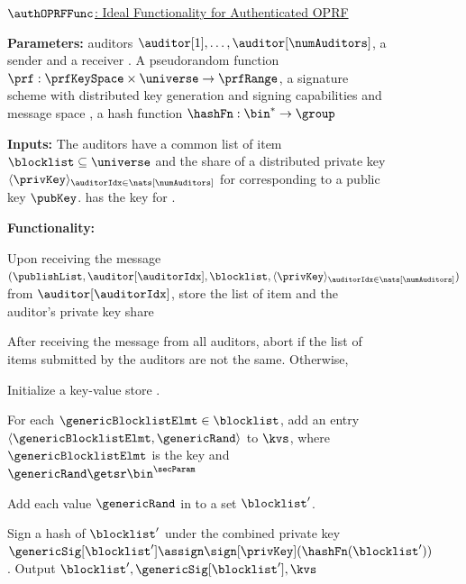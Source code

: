 \begin{figure}
\begin{mdframed}
\footnotesize 

\underline{$\authOPRFFunc$: Ideal Functionality for Authenticated OPRF}
		
		
		\smallskip\noindent\textbf{Parameters:} \numAuditors auditors $\auditor[1], \dots, \auditor[\numAuditors]$, a sender \client and a receiver \server. A pseudorandom function $\prf: \prfKeySpace \times \universe   \rightarrow \prfRange$, a signature scheme \ourSigSchemeDefn with distributed key generation and signing capabilities and message space \group, a hash function $\hashFn: \bin^{\ast} \rightarrow \group$   

		\smallskip\noindent\textbf{Inputs:} The auditors have a common list of item $\blocklist \subseteq \universe$ and the share of a distributed private key $\langle \privKey \rangle_{\auditorIdx \in \nats[\numAuditors]}$ for \ourSigScheme corresponding to a public key $\pubKey$. \client has the key \prfKey for \prf. 



		\smallskip\noindent\textbf{Functionality:} 
\itemListStart

\item	Upon receiving the message $(\publishList, \auditor[\auditorIdx], \blocklist, \langle \privKey \rangle_{\auditorIdx \in \nats[\numAuditors]})$ from $\auditor[\auditorIdx]$, store the list of item \blocklist and the auditor's private key share

\item After receiving the \publishList message from all auditors, abort if the list of items \blocklist submitted by the auditors are not the same. Otherwise, 

\enumListStart
\item Initialize a key-value store \kvs. 
\item For each $\genericBlocklistElmt \in \blocklist$, add an entry $\langle \genericBlocklistElmt, \genericRand \rangle$ to $\kvs$, where $\genericBlocklistElmt$ is the key and $\genericRand \getsr \bin^{\secParam}$
\item Add each value $\genericRand$ in \kvs to a set $\blocklist'$.   
\item Sign a hash of $\blocklist'$ under the combined private key $\genericSig[\blocklist'] \assign \sign[\privKey](\hashFn(\blocklist'))$. Output $\blocklist', \genericSig[\blocklist'], \kvs$




\end{mdframed}
\end{figure}
